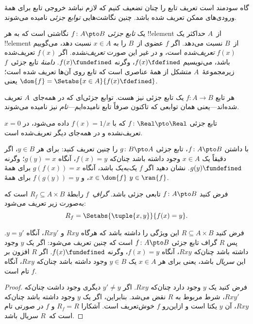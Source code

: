 \documentclass[../../../include/open-logic-section]{subfiles}
\begin{document}


\begin{explain}
گاه سودمند است تعریف تابع را چنان تضعیف کنیم که لازم نباشد
خروجی تابع برای همهٔ ورودی‌های ممکن تعریف شده باشد. چنین
نگاشت‌هایی \emph{توابع جزئی} نامیده می‌شوند.
\end{explain}

\begin{defn}
یک \emph{تابع جزئی} $f \colon A \pto B$ نگاشتی است که
به هر !!{element} از~$A$ حداکثر یک !!{element} از~$B$ نسبت می‌دهد.
اگر $f$ عضوی از~$B$ را به $x \in A$ نسبت دهد، می‌گوییم $f(x)$
\emph{تعریف‌شده} است، و در غیر این صورت \emph{تعریف‌نشده}. اگر $f(x)$ تعریف‌شده باشد،
می‌نویسیم $f(x) \fdefined$، وگرنه $f(x) \fundefined$. \emph{دامنهٔ}
تابع جزئی~$f$ زیرمجموعهٔ~$A$ متشکل از همهٔ عناصری است که تابع روی آن‌ها
تعریف شده است؛ یعنی $\dom{f} = \Setabs{x \in A}{f(x) \fdefined}$.
\end{defn}

\begin{ex}
هر تابع $f\colon A \to B$ یک تابع جزئی نیز هست. توابع
جزئی‌ای که در همه‌جای~$A$ تعریف شده‌اند---یعنی همان توابعی که تاکنون
صرفاً تابع نامیده‌ایم---\emph{تام} نیز نامیده
می‌شوند.
\end{ex}

\begin{ex}
تابع جزئی $f \colon \Real \pto \Real$ که با $f(x) = 1/x$
داده می‌شود، در $x = 0$ تعریف‌نشده و در همه‌جای دیگر تعریف‌شده است.
\end{ex}

\begin{prob}
با داشتن $f\colon A \pto B$، تابع جزئی $g\colon B \pto
A$ را چنین تعریف کنید: برای هر $y \in B$، اگر دقیقاً یک $x \in A$ وجود داشته باشد
چنان‌که $f(x) = y$، آنگاه $g(y) = x$؛ وگرنه $g(y) \fundefined$. نشان دهید
اگر $f$ یک‌به‌یک باشد، آنگاه $g(f(x)) = x$ برای همهٔ $x \in \dom{f}$، و
$f(g(y)) = y$ برای همهٔ $y \in \ran{f}$.
\end{prob}

\begin{defn}
فرض کنید $f\colon A \pto B$ تابعی جزئی باشد. \emph{گرافِ}~$f$
رابطهٔ $R_f \subseteq A \times B$ است که به‌صورت زیر تعریف می‌شود:
\[
R_f = \Setabs{\tuple{x,y}}{f(x) = y}.
\]
\end{defn}

\begin{prop}
فرض کنید $R \subseteq A \times B$ این ویژگی را داشته باشد که هرگاه $Rxy$
و $Rxy'$، آنگاه $y = y'$. پس $R$ گراف تابع جزئی
$f\colon A \pto B$ است که چنین تعریف می‌شود: اگر یک $y$ وجود داشته باشد چنان‌که
$Rxy$، آنگاه $f(x) = y$، وگرنه $f(x) \fundefined$. اگر $R$ افزون بر این
\emph{سریال} باشد، یعنی برای هر $x \in A$ یک $y \in B$ وجود داشته باشد چنان‌که
$Rxy$، آنگاه $f$ تام است.
\end{prop}

\begin{proof}
فرض کنید یک $y$ وجود دارد چنان‌که $Rxy$. اگر $y'
\neq y$ دیگری وجود داشت چنان‌که $Rxy'$، شرط مربوط به $R$
نقض می‌شد. بنابراین، اگر یک $y$ وجود داشته باشد چنان‌که $Rxy$، آن $y$
یکتا است و ازاین‌رو $f$ خوش‌تعریف است. آشکارا $R_f = R$ و $f$ در صورتی
تام است که~$R$ سریال باشد.
\end{proof}
\end{document}

